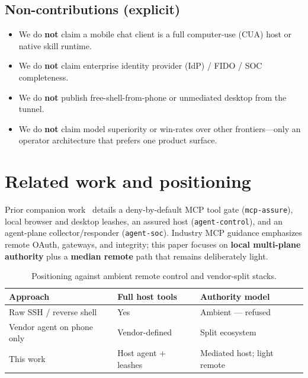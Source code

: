 \documentclass[11pt,a4paper]{article}
\begin{document}
\subsection{Non-contributions (explicit)}

\begin{itemize}[leftmargin=*]
  \item We do \textbf{not} claim a mobile chat client is a full computer-use (CUA)
        host or native skill runtime.
  \item We do \textbf{not} claim enterprise identity provider (IdP) / FIDO / SOC
        completeness.
  \item We do \textbf{not} publish free-shell-from-phone or unmediated desktop from
        the tunnel.
  \item We do \textbf{not} claim model superiority or win-rates over other
        frontiers---only an operator architecture that prefers one product surface.
\end{itemize}

\section{Related work and positioning}

Prior companion work~\cite{price2026authority} details a deny-by-default MCP tool
gate (\texttt{mcp-assure}), local browser and desktop leashes, an assured host
(\texttt{agent-control}), and an agent-plane collector/responder
(\texttt{agent-soc}). Industry MCP guidance emphasizes remote OAuth, gateways, and
integrity; this paper focuses on \textbf{local multi-plane authority} plus a
\textbf{median remote} path that remains deliberately light.

\begin{table}[h]
\centering
\small
\begin{tabular}{@{}lll@{}}
\toprule
\textbf{Approach} & \textbf{Full host tools} & \textbf{Authority model} \\
\midrule
Raw SSH / reverse shell & Yes & Ambient --- refused \\
Vendor agent on phone only & Vendor-defined & Split ecosystem \\
This work & Host agent + leashes & Mediated host; light remote \\
\bottomrule
\end{tabular}
\caption{Positioning against ambient remote control and vendor-split stacks.}
\label{tab:position}
\end{table}
\end{document}

